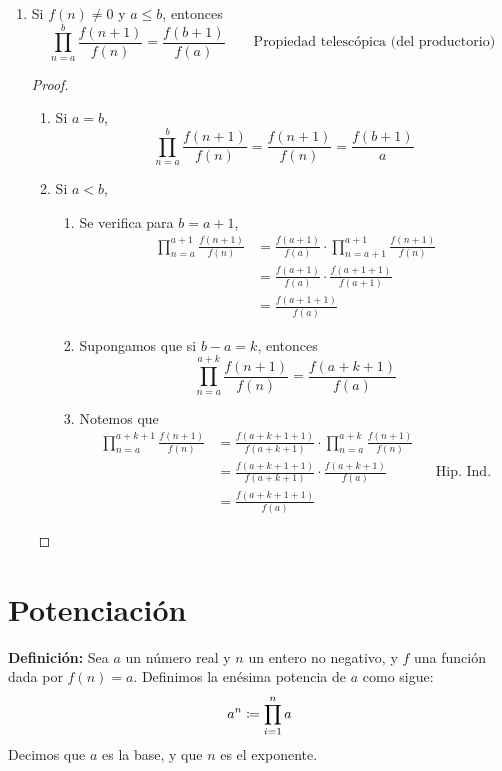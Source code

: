 \begin{enumerate}[label=\alph*)]
    \item Si $f(n)\neq 0$ y $a\leq b$, entonces \[\prod_{n=a}^{b} \frac{f(n+1)}{f(n)} = \frac{f(b+1)}{f(a)} \qquad \text{Propiedad telescópica (del productorio)}\]
    \begin{proof}\leavevmode
      \begin{enumerate}[label=\Roman*)]
        \item Si $a=b$, \[\prod_{n=a}^{b} \frac{f(n+1)}{f(n)} = \frac{f(n+1)}{f(n)} = \frac{f(b+1)}{a}\]
        \item Si $a<b$,
        \begin{enumerate}[label=\roman*)]
          \item Se verifica para $b=a+1$,
          \begin{align*}
            \prod_{n=a}^{a+1} \frac{f(n+1)}{f(n)} &= \frac{f(a+1)}{f(a)} \cdot \prod_{n=a+1}^{a+1} \frac{f(n+1)}{f(n)}\\
            &= \frac{f(a+1)}{f(a)} \cdot \frac{f(a+1+1)}{f(a+1)}\\
            &= \frac{f(a+1+1)}{f(a)}
          \end{align*}
          \item Supongamos que si $b-a=k$, entonces
          \[\prod_{n=a}^{a+k} \frac{f(n+1)}{f(n)} = \frac{f(a+k+1)}{f(a)}\]
          \item Notemos que
          \begin{align*}
            \prod_{n=a}^{a+k+1} \frac{f(n+1)}{f(n)} &= \frac{f(a+k+1+1)}{f(a+k+1)} \cdot \prod_{n=a}^{a+k} \frac{f(n+1)}{f(n)}\\
            &= \frac{f(a+k+1+1)}{f(a+k+1)} \cdot \frac{f(a+k+1)}{f(a)} && \text{Hip. Ind.}\\
            &= \frac{f(a+k+1+1)}{f(a)}
          \end{align*}
        \end{enumerate}
      \end{enumerate}
      
    \end{proof}
\end{enumerate}

\section*{Potenciación}

\textbf{Definición:} Sea $a$ un número real y $n$ un entero no negativo, y $f$ una función dada por $f(n)=a$. Definimos la enésima potencia de $a$ como sigue:
\[a^n \coloneqq \prod_{i=1}^{n} a\]
Decimos que $a$ es la base, y que $n$ es el exponente.

